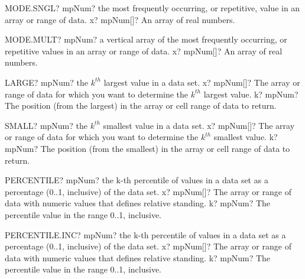 \documentclass[12pt,a4paper,openany]{book}
\begin{document}
\begin{mpFunctionsExtract}
\mpWorksheetFunctionOneNotImplemented
{MODE.SNGL? mpNum? the most frequently occurring, or repetitive, value in an array or range of data.}
{x? mpNum[]? An array of real numbers.}
\end{mpFunctionsExtract}

\begin{mpFunctionsExtract}
\mpWorksheetFunctionOneNotImplemented
{MODE.MULT? mpNum? a vertical array of the most frequently occurring, or repetitive values in an array or range of data.}
{x? mpNum[]? An array of real numbers.}
\end{mpFunctionsExtract}

\begin{mpFunctionsExtract}
\mpWorksheetFunctionTwoNotImplemented
{LARGE? mpNum? the $k^{th}$ largest value in a data set.}
{x? mpNum[]?  The array or range of data for which you want to determine the $k^{th}$ largest value.}
{k? mpNum? The position (from the largest) in the array or cell range of data to return.}
\end{mpFunctionsExtract}

\begin{mpFunctionsExtract}
\mpWorksheetFunctionTwoNotImplemented
{SMALL? mpNum? the $k^{th}$ smallest value in a data set.}
{x? mpNum[]?  The array or range of data for which you want to determine the $k^{th}$ smallest value.}
{k? mpNum? The position (from the smallest) in the array or cell range of data to return.}
\end{mpFunctionsExtract}

\begin{mpFunctionsExtract}
\mpWorksheetFunctionTwoNotImplemented
{PERCENTILE? mpNum? the k-th percentile of values  in a data set as a percentage (0..1, inclusive) of the data set.}
{x? mpNum[]?  The array or range of data with numeric values that defines relative standing.}
{k? mpNum? The percentile value in the range 0..1, inclusive.}
\end{mpFunctionsExtract}

\begin{mpFunctionsExtract}
\mpWorksheetFunctionTwoNotImplemented
{PERCENTILE.INC? mpNum? the k-th percentile of values  in a data set as a percentage (0..1, inclusive) of the data set.}
{x? mpNum[]?  The array or range of data with numeric values that defines relative standing.}
{k? mpNum? The percentile value in the range 0..1, inclusive.}
\end{mpFunctionsExtract}
\end{document}
